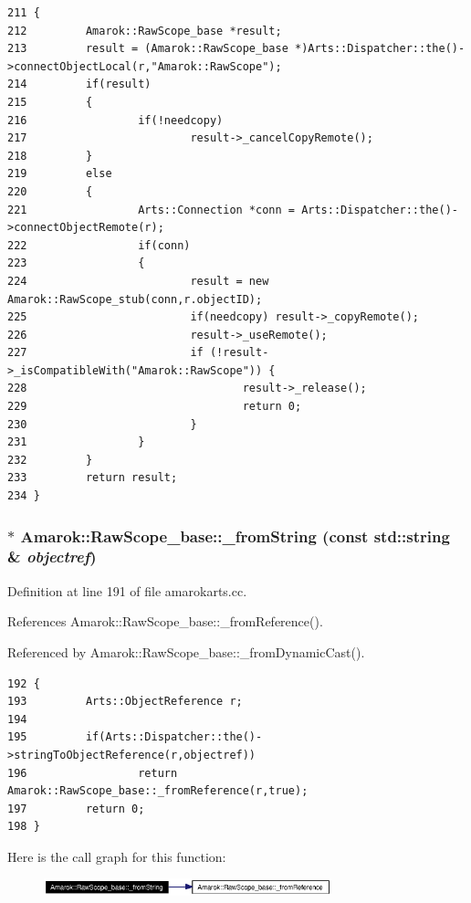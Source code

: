 \footnotesize\begin{verbatim}211 {
212         Amarok::RawScope_base *result;
213         result = (Amarok::RawScope_base *)Arts::Dispatcher::the()->connectObjectLocal(r,"Amarok::RawScope");
214         if(result)
215         {
216                 if(!needcopy)
217                         result->_cancelCopyRemote();
218         }
219         else
220         {
221                 Arts::Connection *conn = Arts::Dispatcher::the()->connectObjectRemote(r);
222                 if(conn)
223                 {
224                         result = new Amarok::RawScope_stub(conn,r.objectID);
225                         if(needcopy) result->_copyRemote();
226                         result->_useRemote();
227                         if (!result->_isCompatibleWith("Amarok::RawScope")) {
228                                 result->_release();
229                                 return 0;
230                         }
231                 }
232         }
233         return result;
234 }
\end{verbatim}\normalsize 
{}
\subsubsection{ $\ast$ Amarok::Raw\-Scope\_\-base::\_\-from\-String (const std::string \& {\em objectref})\hspace{0.3cm}{\tt  [static, inherited]}}\label{classAmarok_1_1RawScope__base_Amarok_1_1RawScope__stube1}




Definition at line 191 of file amarokarts.cc.

References Amarok::Raw\-Scope\_\-base::\_\-from\-Reference().

Referenced by Amarok::Raw\-Scope\_\-base::\_\-from\-Dynamic\-Cast().



\footnotesize\begin{verbatim}192 {
193         Arts::ObjectReference r;
194 
195         if(Arts::Dispatcher::the()->stringToObjectReference(r,objectref))
196                 return Amarok::RawScope_base::_fromReference(r,true);
197         return 0;
198 }
\end{verbatim}\normalsize 


Here is the call graph for this function:\begin{figure}[H]
\begin{center}
\leavevmode
\includegraphics[width=236pt]{classAmarok_1_1RawScope__base_Amarok_1_1RawScope__stube1_cgraph}
\end{center}
\end{figure}
